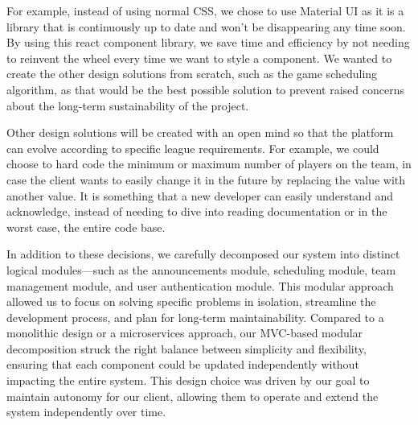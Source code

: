 \documentclass[12pt, titlepage]{article}
\begin{document}
\begin{enumerate}
        For example, instead of using normal CSS, we chose to use Material UI as it is a library that is continuously up to date and won’t be disappearing any time soon. By using this react component library, we save time and efficiency by not needing to reinvent the wheel every time we want to style a component. We wanted to create the other design solutions from scratch, such as the game scheduling algorithm, as that would be the best possible solution to prevent raised concerns about the long-term sustainability of the project.

        Other design solutions will be created with an open mind so that the platform can evolve according to specific league requirements. For example, we could choose to hard code the minimum or maximum number of players on the team, in case the client wants to easily change it in the future by replacing the value with another value. It is something that a new developer can easily understand and acknowledge, instead of needing to dive into reading documentation or in the worst case, the entire code base.

        In addition to these decisions, we carefully decomposed our system into distinct logical modules—such as the announcements module, scheduling module, team management module, and user authentication module. This modular approach allowed us to focus on solving specific problems in isolation, streamline the development process, and plan for long-term maintainability. Compared to a monolithic design or a microservices approach, our MVC-based modular decomposition struck the right balance between simplicity and flexibility, ensuring that each component could be updated independently without impacting the entire system. This design choice was driven by our goal to maintain autonomy for our client, allowing them to operate and extend the system independently over time.

\end{enumerate}
\end{document}
